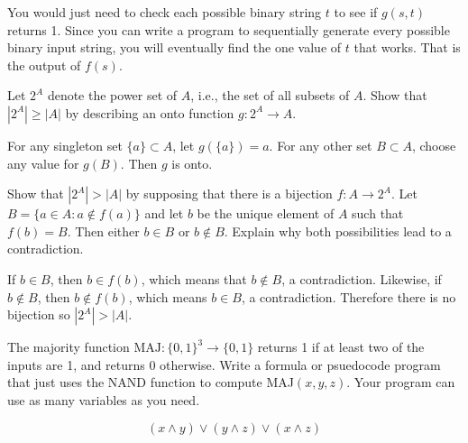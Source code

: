 \documentclass[12pt]{exam}
\begin{document}
\begin{questions}
\begin{solution}
You would just need to check each possible binary string $t$ to see if $g(s,t)$ returns 1.  Since you can write a program to sequentially generate every possible binary input string, you will eventually find the one value of $t$ that works.  That is the output of $f(s)$. 

\end{solution}

\vfill

\newpage
{}

\question Let $2^A$ denote the power set of $A$, i.e., the set of all subsets of $A$. Show that $|2^A| \ge |A|$ by describing an onto function $g:2^A \rightarrow A$. 
\begin{solution}
For any singleton set $\{a\} \subset A$, let $g(\{a\}) = a$. For any other set $B \subset A$, choose any value for $g(B)$.  Then $g$ is onto.
\end{solution}
\vfill

\question Show that $|2^A| > |A|$ by supposing that there is a bijection $f:A \rightarrow 2^A$.  Let $B = \{a \in A : a \notin f(a)\}$ and let $b$ be the unique element of $A$ such that $f(b) = B$.  Then either $b \in B$ or $b \notin B$.  Explain why both possibilities lead to a contradiction.
\begin{solution}
If $b \in B$, then $b \in f(b)$, which means that $b \notin B$, a contradiction.  Likewise, if $b \notin B$, then $b \notin f(b)$, which means $b \in B$, a contradiction.  Therefore there is no bijection so $|2^A| > |A|$.
\end{solution}
\vfill

\question \label{majority} The majority function $\text{MAJ}:\{0,1\}^3 \rightarrow \{0,1\}$ returns 1 if at least two of the inputs are 1, and returns 0 otherwise. Write a formula or psuedocode program that just uses the NAND function to compute MAJ$(x,y,z)$.  Your program can use as many variables as you need.  %
\begin{solution}
$$(x \wedge y) \vee (y \wedge z) \vee (x \wedge z)$$
\end{solution}
\vfill


\end{questions}
\end{document}
